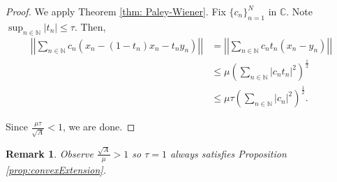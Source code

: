 \documentclass[11pt, reqno]{amsart}
\providecommand{\C}{\mathbb C}
\providecommand{\N}{\mathbb N}
\newcommand{\norm}[1]{\left|\left| #1 \right|\right|}
\newtheorem*{remark}{Remark}
\numberwithin{equation}{section}
\begin{document}
\begin{proof}
    We apply Theorem \ref{thm: Paley-Wiener}. Fix $\{c_n\}_{n=1}^N$ in $\C$. Note $\sup_{n \in \N}|t_n|\le \tau$. Then, \begin{align*}
        \norm{\sum_{n \in \N} c_n(x_n - (1-t_n)x_n-t_ny_n) } &=\norm{\sum_{n \in \N}c_nt_n(x_n-y_n)}\\
        &\le \mu \left(\sum_{n \in \N} |c_nt_n|^2\right)^{\frac{1}{2}}\\
        &\le \mu \tau  \left(\sum_{n \in \N} |c_n|^2\right)^{\frac{1}{2}}.
    \end{align*}

    Since $\frac{\mu\tau}{\sqrt{A}}<1$, we are done.
\end{proof}

\begin{remark}
    Observe $\frac{\sqrt{A}}{\mu}>1$ so $\tau =1$ always satisfies Proposition \ref{prop:convexExtension}.
\end{remark}






\end{document}
